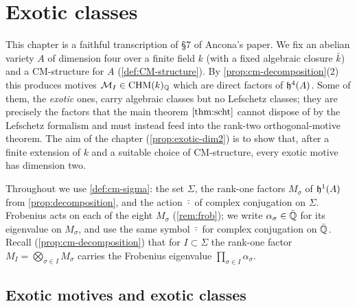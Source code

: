 \chapter{Exotic classes}

\providecommand{\Frob}{\mathrm{Frob}}

This chapter is a faithful transcription of \S7 of Ancona's paper. We fix an
abelian variety \(A\) of dimension four over a finite field \(k\) (with a fixed
algebraic closure \(\bar k\)) and a CM-structure for \(A\)
(\cref{def:CM-structure}). By \cref{prop:cm-decomposition}(2) this produces
motives \(\mathcal{M}_I \in \mathrm{CHM}(k)_{\mathbb{Q}}\) which are direct factors of
\(\mathfrak{h}^{4}(A)\). Some of them, the \emph{exotic} ones, carry algebraic classes
but no Lefschetz classes; they are precisely the factors that the main theorem
\(\cref{thm:scht}\) cannot dispose of by the Lefschetz formalism and must instead
feed into the rank-two orthogonal-motive theorem. The aim of the chapter
(\cref{prop:exotic-dim2}) is to show that, after a finite extension of \(k\) and a
suitable choice of CM-structure, every exotic motive has dimension two.

Throughout we use \cref{def:cm-sigma}: the set \(\Sigma\), the rank-one factors
\(M_\sigma\) of \(\mathfrak{h}^1(A)\) from \cref{prop:decomposition}, and the action
\(\bar{\cdot}\) of complex conjugation on \(\Sigma\). Frobenius acts on each of
the eight \(M_\sigma\) (\cref{rem:frob}); we write \(\alpha_\sigma \in \bar{\mathbb{Q}}\)
for its eigenvalue on \(M_\sigma\), and use the same symbol \(\bar{\cdot}\) for
complex conjugation on \(\bar{\mathbb{Q}}\). Recall (\cref{prop:cm-decomposition}) that for
\(I \subset \Sigma\) the rank-one factor \(M_I = \bigotimes_{\sigma \in I}
M_\sigma\) carries the Frobenius eigenvalue \(\prod_{\sigma \in I} \alpha_\sigma\).

\section*{Exotic motives and exotic classes}

